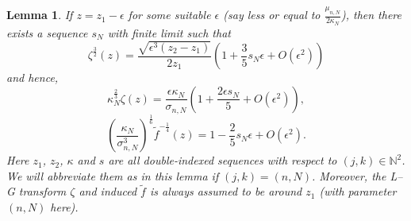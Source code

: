 \documentclass[10pt,a4paper]{amsart}
\newtheorem{lemma}{Lemma}
\begin{document}
\begin{lemma}\label{seq}
    If $z=z_1-\epsilon$ for some suitable $\epsilon$ (say less or equal to $\frac{\mu_{n,N}}{2\kappa_{N}}$), then there exists a sequence $s_N$ with finite limit such that
    \begin{equation}\label{a4zeta}
    \zeta^{\frac{3}{2}}(z)=\frac{\sqrt{\epsilon^3(z_{2}-z_{1})}}{2z_{1}}\left(1+\frac{3}{5}s_{N}\epsilon+O(\epsilon^2)\right)
\end{equation}
and hence,
\begin{equation}\label{a4zeta2}
   \kappa_{N}^{\frac{2}{3}}\zeta(z)=\frac{\epsilon\kappa_{N}}{\sigma_{n,N}}\left(1+\frac{2\epsilon s_{N}}{5}+O(\epsilon^2)\right),
\end{equation}
\begin{equation}\label{a4inverse}
    \left(\frac{\kappa_{N}}{\sigma^3_{n,N}}\right)^{\frac{1}{6}}\tilde{f}^{-\frac{1}{4}}(z)=1-\frac{2}{5} s_{N}\epsilon+O(\epsilon^2).
\end{equation}
Here $z_1$, $z_2$, $\kappa$ and $s$ are all double-indexed sequences with respect to $(j,k)\in\mathbb{N}^2$. We will abbreviate them as in this lemma if $(j,k)=(n,N)$. Moreover, the L--G transform $\zeta$ and induced $\tilde{f}$ is always assumed to be around $z_1$ (with parameter $(n,N)$ here).
\end{lemma}
\end{document}
